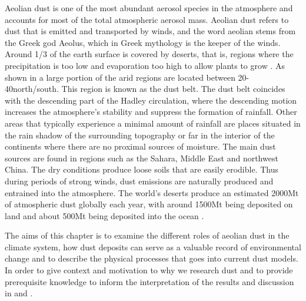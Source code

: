 
\label{chap:dust_roles_models}
Aeolian dust is one of the most abundant aerosol species in the atmosphere and accounts for most of the total atmospheric aerosol mass.
Aeolian dust refers to dust that is emitted and transported by winds, and the word aeolian stems from the Greek god Aeolus, which in Greek mythology is the keeper of the winds. 
Around 1/3 of the earth surface is covered by deserts, that is, regions where the precipitation is too low and evaporation too high to allow plants to grow \parencite{williams_climate_2014}.
As shown in  a large portion of the arid regions are located between 20\degree - 40\degree north/south. 
This region is known as the dust belt. 
The dust belt coincides with the descending part of the Hadley circulation, where the descending motion increases the atmosphere's stability and suppress the formation of rainfall. 
Other areas that typically experience a minimal amount of rainfall are places situated in the rain shadow of the surrounding topography or far in the interior of the continents where there are no proximal sources of moisture.  
The main dust sources are found in regions such as the Sahara, Middle East and northwest China.
The dry conditions produce loose soils that are easily erodible. 
Thus during periods of strong winds, dust emissions are naturally produced and entrained into the atmosphere. 
The world's deserts produce an estimated 2000Mt of atmospheric dust globally each year, with around 1500Mt being deposited on land and about 500Mt being deposited into the ocean \parencite{shao2011dust}. 

The aims of this chapter is to examine the different roles of aeolian dust in the climate system, how dust deposits can serve as a valuable record of environmental change and to describe the physical processes that goes into current dust models. In order to give context and motivation to why we research dust and to provide prerequisite knowledge to inform the interpretation of the results and discussion in  and .  

